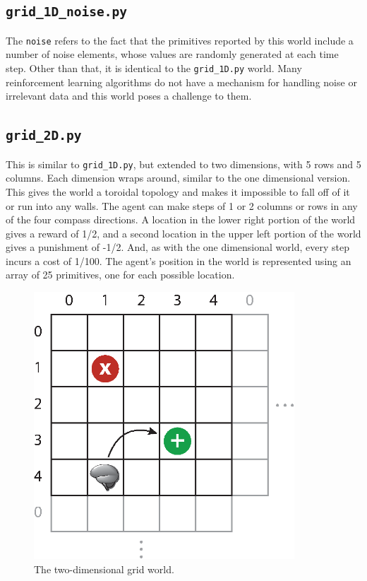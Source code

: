 \subsection{\texttt{grid\_1D\_noise.py}}

The \texttt{noise} refers to the fact that the primitives reported by this world include a number of noise elements, whose values are randomly generated at each time step. Other than that, it is identical to the  \texttt{grid\_1D.py} world. Many reinforcement learning algorithms do not have a mechanism for handling noise or irrelevant data and this world poses a challenge to them. 

\subsection{\texttt{grid\_2D.py}}

This is similar to \texttt{grid\_1D.py}, but extended to two dimensions, with 5 rows and 5 columns. Each dimension wraps around, similar to the one dimensional version. This gives the world a toroidal topology and makes it impossible to fall off of it or run into any walls. The agent can make steps of 1 or 2 columns or rows in any of the four compass directions. A location in the lower right portion of the world gives a reward of 1/2, and a second location in the upper left portion of the world gives a punishment of -1/2. And, as with the one dimensional world, every step incurs a cost of 1/100. The agent's position in the world is represented using an array of 25 primitives, one for each possible location. 

\begin{figure}
\centering
\includegraphics[height=10cm]{figs/grid_world_2D.eps}
\caption{The two-dimensional grid world.}
\label{grid_2D}
\end{figure}

